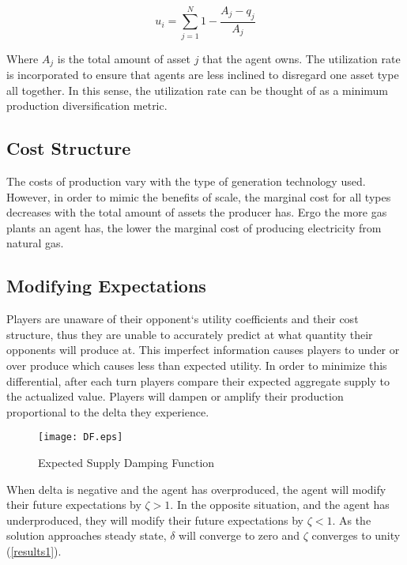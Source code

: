 \documentclass{article}
\begin{document}
	\begin{equation}
		u_{i} = \sum_{j=1}^{N}1 - \frac{A_{j}-q_{j}}{A_{j}}
	\end{equation}

Where $A_{j}$ is the total amount of asset $j$ that the agent owns.\*
The utilization rate is incorporated to ensure that agents are less inclined to disregard one asset type all together. In this sense, the utilization rate can be thought of as a minimum production diversification metric. 


\subsection{Cost Structure}
The costs of production vary with the type of generation technology used. However, in order to mimic the benefits of scale, the marginal cost for all types decreases with the total amount of assets the producer has. Ergo the more gas plants an agent has, the lower the marginal cost of producing electricity from natural gas. 


\subsection{Modifying Expectations}
Players are unaware of their opponent`s utility coefficients and their cost structure, thus they are unable to accurately predict at what quantity their opponents will produce at. This imperfect information causes players to under or over produce which causes less than expected utility. In order to minimize this differential, after each turn players compare their expected aggregate supply to the actualized value. Players will dampen or amplify their production proportional to the delta they experience. 


	\begin{figure}[ht!]
		\begin{center}
		\texttt{[image: DF.eps]}
		\caption{Expected Supply Damping Function}
		\end{center}
	\end{figure}

When delta is negative and the agent has overproduced, the agent will modify their future expectations by $\zeta > 1$. In the opposite situation, and the agent has underproduced, they will modify their future expectations by $\zeta < 1$. As the solution approaches steady state, $\delta$ will converge to zero and $\zeta$ converges to unity (\cref{results1}). 
\end{document}
